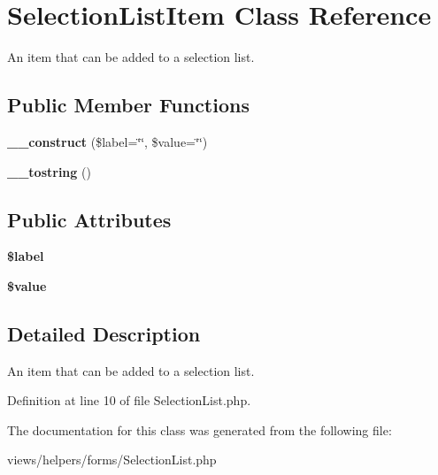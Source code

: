 \hypertarget{class_selection_list_item}{
\section{SelectionListItem Class Reference}
\label{class_selection_list_item}
}


An item that can be added to a selection list.  


\subsection*{Public Member Functions}
\begin{DoxyCompactItemize}
\item 
\hypertarget{class_selection_list_item_a0400770f9982cae8f710b8ddf38b68be}{
{\bfseries \_\-\_\-construct} (\$label=\char`\"{}\char`\"{}, \$value=\char`\"{}\char`\"{})}
\label{class_selection_list_item_a0400770f9982cae8f710b8ddf38b68be}

\item 
\hypertarget{class_selection_list_item_a2d764eb3f014c4c58e860cdc22f287b5}{
{\bfseries \_\-\_\-tostring} ()}
\label{class_selection_list_item_a2d764eb3f014c4c58e860cdc22f287b5}

\end{DoxyCompactItemize}
\subsection*{Public Attributes}
\begin{DoxyCompactItemize}
\item 
\hypertarget{class_selection_list_item_a556f9aba520e6b65bc7aabc9326b66c3}{
{\bfseries \$label}}
\label{class_selection_list_item_a556f9aba520e6b65bc7aabc9326b66c3}

\item 
\hypertarget{class_selection_list_item_ae1a18dad4f665f1b3d3f134dcba0d00f}{
{\bfseries \$value}}
\label{class_selection_list_item_ae1a18dad4f665f1b3d3f134dcba0d00f}

\end{DoxyCompactItemize}


\subsection{Detailed Description}
An item that can be added to a selection list. 

Definition at line 10 of file SelectionList.php.



The documentation for this class was generated from the following file:\begin{DoxyCompactItemize}
\item 
views/helpers/forms/SelectionList.php\end{DoxyCompactItemize}
